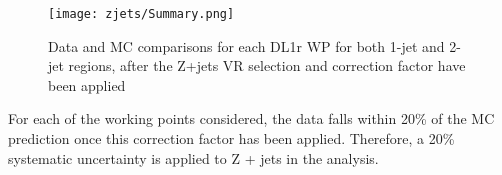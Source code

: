                                                                                                                              
\begin{figure}[H]                                                                                                            
   \centering
   \texttt{[image: zjets/Summary.png]}
   \caption{Data and MC comparisons for each DL1r WP for both 1-jet and 2-jet regions, after the Z+jets VR selection and correction factor have been applied}                                                                                             
   \label{fig:ttbar_summary}
\end{figure}

For each of the working points considered, the data falls within 20\% of the MC prediction once this correction factor has been applied. Therefore, a 20\% systematic uncertainty is applied to Z + jets in the analysis.
